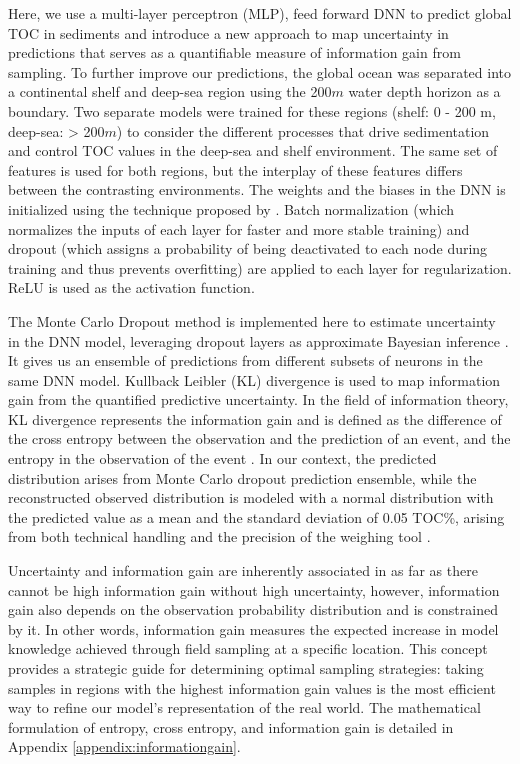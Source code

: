 \documentclass[journal abbreviation, manuscript]{copernicus}
\begin{document}
Here, we use a multi-layer perceptron (MLP), feed forward DNN to predict global TOC in sediments and introduce a new approach to map uncertainty in predictions that serves as a quantifiable measure of information gain from sampling. To further improve our predictions,  the global ocean was separated into a continental shelf and deep-sea region using the 200$m$ water depth horizon as a boundary.  Two separate models were trained for these regions (shelf: 0 - 200 m, deep-sea: > 200$m$)  to consider the different processes that drive sedimentation and control TOC values in the deep-sea and shelf environment. The same set of features is used for both regions, but the interplay of these features differs between the contrasting environments. The weights and the biases in the DNN is initialized using the technique proposed by \cite{he2015delving}. Batch normalization (which normalizes the inputs of each layer for faster and more stable training) and dropout (which assigns a probability of being deactivated to each node during training and thus prevents overfitting) are applied to each layer for regularization. ReLU is used as the activation function. 



The Monte Carlo Dropout method is implemented here to estimate uncertainty in the DNN model, leveraging dropout layers as approximate Bayesian inference \citep{MCDropout}. It gives us an ensemble of predictions from different subsets of neurons in the same DNN model. Kullback Leibler (KL) divergence is used to map information gain from the quantified predictive uncertainty. In the field of information theory, KL divergence represents the information gain and is defined as the difference of the cross entropy between the observation and the prediction of an event, and the entropy in the observation of the event \citep{kullbackleibler1951}. In our context, the predicted distribution arises from Monte Carlo dropout prediction ensemble, while the reconstructed observed distribution is modeled with a normal distribution with the predicted value as a mean and the standard deviation of 0.05 TOC\%, arising from both technical handling and the precision of the weighing tool \citep{pape2020}.

Uncertainty and information gain are inherently associated in as far as there cannot be high information gain without high uncertainty, however, information gain also depends on the observation probability distribution and is constrained by it. In other words, information gain measures the expected increase in model knowledge achieved through field sampling at a specific location. This concept provides a strategic guide for determining optimal sampling strategies: taking samples in regions with the highest information gain values is the most efficient way to refine our model’s representation of the real world. The mathematical formulation of entropy, cross entropy, and information gain is detailed in Appendix \ref{appendix:informationgain}.
\end{document}
